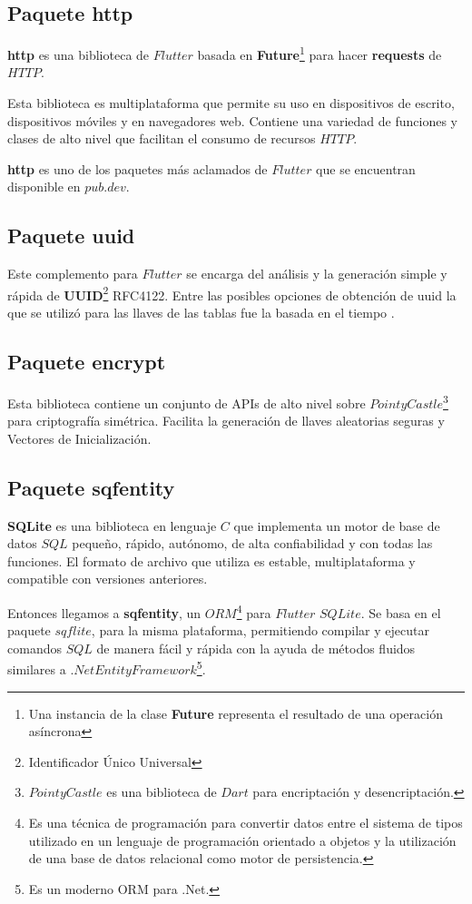 \subsection{Paquete http}

\textbf{http} es una biblioteca de $Flutter$ basada en \textbf{Future}\footnote{Una instancia de la clase \textbf{Future} representa el resultado de una operación asíncrona} para hacer \textbf{requests} de $HTTP$.

Esta biblioteca es multiplataforma que permite su uso en dispositivos de escrito, dispositivos móviles y en navegadores web. Contiene una variedad de funciones y clases de alto nivel que facilitan el consumo de recursos $HTTP$. 

\textbf{http}  es uno de los paquetes más aclamados de $Flutter$ que se encuentran disponible en $pub.dev$.

\subsection{Paquete uuid}
Este complemento para $Flutter$ se encarga del análisis y la generación simple y rápida de \textbf{UUID}\footnote{Identificador Único Universal}  RFC4122. Entre las posibles opciones de obtención de uuid la que se utilizó para las llaves de las tablas fue la basada en el tiempo . 


\subsection{Paquete encrypt}
Esta biblioteca contiene un conjunto de APIs de alto nivel sobre $PointyCastle$\footnote{$PointyCastle$ es una biblioteca de $Dart$ para encriptación y desencriptación.} para criptografía simétrica. Facilita la generación de llaves aleatorias seguras y Vectores de Inicialización.


\subsection{Paquete sqfentity}
\textbf{SQLite} es una biblioteca en lenguaje $C$ que implementa un motor de base de datos $SQL$ pequeño, rápido, autónomo, de alta confiabilidad y con todas las funciones. El formato de archivo que utiliza es estable, multiplataforma y compatible con versiones anteriores.
 
Entonces llegamos a \textbf{sqfentity}, un $ORM$\footnote{Es una técnica de programación para convertir datos entre el sistema de tipos utilizado en un lenguaje de programación orientado a objetos y la utilización de una base de datos relacional como motor de persistencia.}  para $Flutter$ $SQLite$. Se basa en el paquete $sqflite$, para la misma plataforma, permitiendo compilar y ejecutar comandos $SQL$ de manera fácil y rápida con la ayuda de métodos fluidos similares a $.Net Entity Framework$\footnote{Es un moderno ORM para .Net.}.


